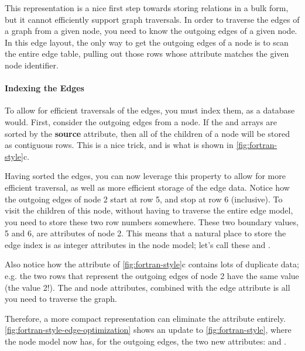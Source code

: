 This representation is a nice first step towards storing relations in a bulk
form, but it cannot efficiently support graph traversals. In order to traverse
the edges of a graph from a given node, you need to know the outgoing edges of a
given node.
In this edge layout, the only way to get the outgoing edges of a node is to scan
the entire edge table, pulling out those rows whose  attribute
matches the given node identifier.

\paragraph{Indexing the Edges}
To allow for efficient traversals of the edges, you must index them, as a
database would. First, consider the outgoing edges from a node. If the
 and  arrays are sorted by the \textbf{source}
attribute, then all of the children of a node will be stored as contiguous rows.
This is a nice trick, and is what is shown in
\autoref{fig:fortran-style}c. 

Having sorted the edges, you can now leverage this property to allow for more
efficient traversal, as well as more efficient storage of the edge data. Notice
how the outgoing edges of node 2 start at row 5, and stop at row 6 (inclusive).
To visit the children of this node, without having to traverse the entire edge
model, you need to store these two row numbers somewhere. These two boundary
values, 5 and 6, are attributes of node 2. This means that a natural place to
store the edge index is as integer attributes in the node model; let's call
these  and .

Also notice how the  attribute of \autoref{fig:fortran-style}c
contains lots of duplicate data; e.g. the two rows that represent the outgoing
edges of node 2 have the same  value (the value 2!). The
 and  node attributes, combined with the 
edge attribute is all you need to traverse the graph. 

Therefore, a more compact representation can eliminate the 
attribute entirely. \autoref{fig:fortran-style-edge-optimization} shows an
update to \autoref{fig:fortran-style}, where the node model now has, for the
outgoing edges, the two new attributes:  and .


